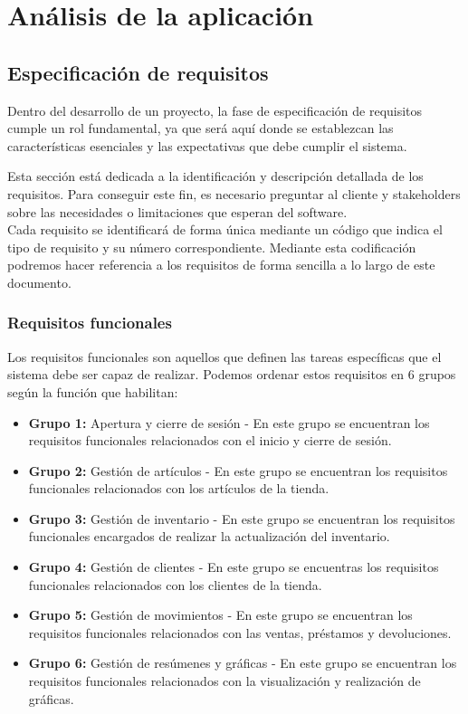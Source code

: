 \chapter{Análisis de la aplicación}
\label{chap:analysis}


\section{Especificación de requisitos}

Dentro del desarrollo de un proyecto, la fase de especificación de requisitos cumple un rol fundamental, ya que será aquí donde se establezcan las características esenciales y las expectativas que debe cumplir el sistema. 

Esta sección está dedicada a la identificación y descripción detallada de los requisitos. Para conseguir este fin, es necesario preguntar al cliente y stakeholders sobre las necesidades o limitaciones que esperan del software.\\
 
Cada requisito se identificará de forma única mediante un código que indica el tipo de requisito y su número correspondiente. Mediante esta codificación podremos hacer referencia a los requisitos de forma sencilla a lo largo de este documento. 


\subsection{Requisitos funcionales}

Los requisitos funcionales son aquellos que definen las tareas específicas que el sistema debe ser capaz de realizar. Podemos ordenar estos requisitos en 6 grupos según la función que habilitan: 

\begin{itemize}
	\item \textbf{Grupo 1:} Apertura y cierre de sesión - En este grupo se encuentran los requisitos funcionales relacionados con el inicio y cierre de sesión.  
	\item \textbf{Grupo 2:} Gestión de artículos - En este grupo se encuentran los requisitos funcionales relacionados con los artículos de la tienda.
	\item \textbf{Grupo 3:} Gestión de inventario - En este grupo se encuentran los requisitos funcionales encargados de realizar la actualización del inventario. 
	\item \textbf{Grupo 4:} Gestión de clientes - En este grupo se encuentras los requisitos funcionales relacionados con los clientes de la tienda. 
	\item \textbf{Grupo 5:} Gestión de movimientos - En este grupo se encuentran los requisitos funcionales relacionados con las ventas, préstamos y devoluciones. 
	\item \textbf{Grupo 6:} Gestión de resúmenes y gráficas - En este grupo se encuentran los requisitos funcionales relacionados con la visualización y realización de gráficas. 
\end{itemize}

